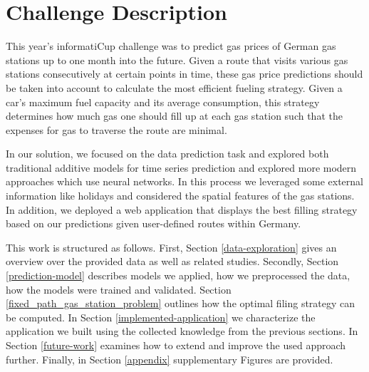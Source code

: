\documentclass[%
a4paper,
DIV12,
2.5headlines,
bigheadings,
titlepage,
openbib,
]{scrartcl}
\begin{document}
\begin{titlepage}
\begin{center}
   \title{\desiredTitle}
   \author{\desiredAuthor}
   \date{Potsdam, January 2018}
   \maketitle
\end{center}
\end{titlepage}

\pagebreak

\tableofcontents
\pagebreak

\section{Challenge Description}\label{challenge-description}
This year's informatiCup challenge was to predict gas prices of German gas stations up to one month into the future.
Given a route that visits various gas stations consecutively at certain points in time, these gas price predictions should be taken into account to calculate the most efficient fueling strategy.
Given a car's maximum fuel capacity and its average consumption, this strategy determines how much gas one should fill up at each gas station such that the expenses for gas to traverse the route are minimal.

In our solution, we focused on the data prediction task and explored both traditional additive models for time series prediction and explored more modern approaches which use neural networks.
In this process we leveraged some external information like holidays and considered the spatial features of the gas stations.
In addition, we deployed a web application that displays the best filling strategy based on our predictions given user-defined routes within Germany.

This work is structured as follows.
First, Section \ref{data-exploration} gives an overview over the provided data as well as related studies.
Secondly, Section \ref{prediction-model} describes models we applied, how we preprocessed the data, how the models were trained and validated.
Section \ref{fixed_path_gas_station_problem} outlines how the optimal filing strategy can be computed.
In Section \ref{implemented-application} we characterize the application we built using the collected knowledge from the previous sections.
In Section \ref{future-work} examines how to extend and improve the used approach further.
Finally, in Section \ref{appendix} supplementary Figures are provided.
\end{document}
